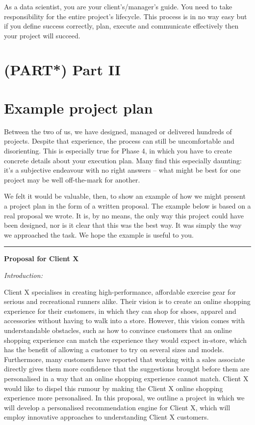 \documentclass[]{book}
\begin{document}
As a data scientist, you are your client's/manager's guide. You need to
take responsibility for the entire project's lifecycle. This process is
in no way easy but if you define success correctly, plan, execute and
communicate effectively then your project will succeed.

\hypertarget{part-part-ii}{%
\chapter*{(PART*) Part II}\label{part-part-ii}}

\hypertarget{example}{%
\chapter{Example project plan}\label{example}}

Between the two of us, we have designed, managed or delivered hundreds
of projects. Despite that experience, the process can still be
uncomfortable and disorienting. This is especially true for Phase 4, in
which you have to create concrete details about your execution plan.
Many find this especially daunting: it's a subjective endeavour with no
right answers -- what might be best for one project may be well
off-the-mark for another.

We felt it would be valuable, then, to show an example of how we might
present a project plan in the form of a written proposal. The example
below is based on a real proposal we wrote. It is, by no means, the only
way this project could have been designed, nor is it clear that this was
the best way. It was simply the way we approached the task. We hope the
example is useful to you.

\begin{center}\rule{0.5\linewidth}{0.5pt}\end{center}

\textbf{Proposal for Client X}

\emph{Introduction:}

Client X specialises in creating high-performance, affordable exercise
gear for serious and recreational runners alike. Their vision is to
create an online shopping experience for their customers, in which they
can shop for shoes, apparel and accessories without having to walk into
a store. However, this vision comes with understandable obstacles, such
as how to convince customers that an online shopping experience can
match the experience they would expect in-store, which has the benefit
of allowing a customer to try on several sizes and models. Furthermore,
many customers have reported that working with a sales associate
directly gives them more confidence that the suggestions brought before
them are personalised in a way that an online shopping experience cannot
match. Client X would like to dispel this rumour by making the Client X
online shopping experience more personalised. In this proposal, we
outline a project in which we will develop a personalised recommendation
engine for Client X, which will employ innovative approaches to
understanding Client X customers.
\end{document}

